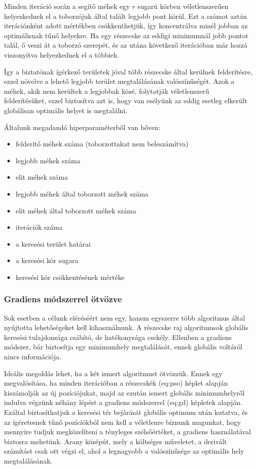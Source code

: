 Minden iteráció során a segítő méhek egy $r$ sugarú körben véletlenszerűen helyezkednek el a toborzójuk által talált legjobb pont körül. Ezt a számot aztán iterációnként adott mértékben csökkenthetjük, így koncentrálva minél jobban az optimálisnak tűnő helyekre. Ha egy részecske az eddigi minimumnál jobb pontot talál, ő veszi át a toborzó szerepét, és az utána következő iterációban már hozzá viszonyítva helyezkednek el a többiek.

Így a biztatónak ígérkező területek jóval több részecske által kerülnek felderítésre, ezzel növelve a lehető legjobb terület megtalálásának valószínűségét. Azok a méhek, akik nem kerültek a legjobbak közé, folytatják véletlenszerű felderítésüket, ezzel biztosítva azt is, hogy van esélyünk az eddig esetleg elkerült globálisan optimális helyet is megtalálni.

Általunk megadandó hiperparaméterből van bőven:
\begin{itemize}
	\itemsep0em 
	\item felderítő méhek száma (toborzottakat nem beleszámítva) 
	\item legjobb méhek száma
	\item elit méhek száma
	\item legjobb méhek által toborzott méhek száma
	\item elit méhek által toborzott méhek száma
	\item iterációk száma
	\item a keresési terület határai
	\item a keresési kör sugara
	\item keresési kör csökkentésének mértéke
\end{itemize}

\subsubsection{Gradiens módszerrel ötvözve}

Sok esetben a célunk eléréséért nem egy, hanem egyszerre több algoritmus által nyújtotta lehetőségeket kell kihasználnunk. A részecske raj algoritmusok globális keresési tulajdonsága csábító, de hatékonysága csekély. Ellenben a gradiens módszer, bár biztosítja egy minimumhely megtalálását, ennek globális voltáról nincs információja.

Ideális megoldás lehet, ha a két ismert algoritmust ötvözzük. Ennek egy megvalósítása, ha minden iterációban a részecskék \aref({eq:pso}) képlet alapján kiszámolják az új pozíciójukat, majd az ezután ismert globális minimumhelyről indulva végzünk néhány lépést a gradiens módszerrel \aref({eq:gd}) képletek alapján. Ezáltal biztosíthatjuk a keresési tér bejárását globális optimum után kutatva, és az ígéretesnek tűnő pozíciókból nem kell a véletlenre bíznunk magunkat, hogy mennyire tudjuk megközelíteni a tényleges szélsőértéket, a gradiens használatával biztosra mehetünk. Arany középút, mely a költséges műveletet, a derivált számítást csak ott végzi el, ahol a legnagyobb a valószínűsége az optimális hely megtalálásának.

